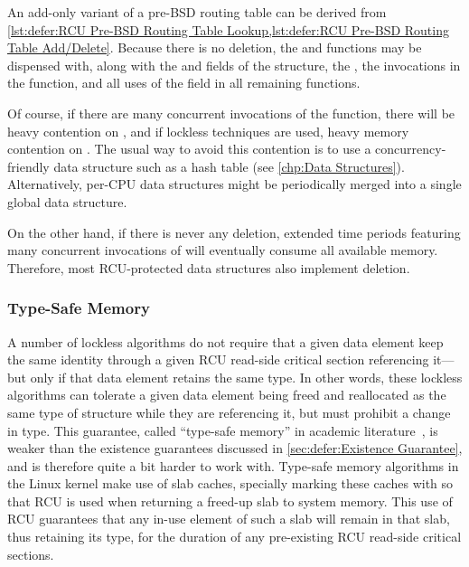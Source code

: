An add-only variant of a pre-BSD routing table can be derived from
\cref{lst:defer:RCU Pre-BSD Routing Table Lookup,lst:defer:RCU Pre-BSD Routing Table Add/Delete}.
Because there is no deletion, the  and 
functions may be dispensed with, along with the 
and  fields of the  structure, the
, the  invocations in the
 function, and all uses of the  field
in all remaining functions.

Of course, if there are many concurrent invocations of the 
function, there will be heavy contention on , and if lockless
techniques are used, heavy memory contention on .
The usual way to avoid this contention is to use a concurrency-friendly
data structure such as a hash table (see \cref{chp:Data Structures}).
Alternatively, per-CPU data structures might be periodically merged
into a single global data structure.

On the other hand, if there is never any deletion, extended time periods
featuring many concurrent invocations of  will eventually
consume all available memory.
Therefore, most RCU-protected data structures also implement deletion.

\subsubsection{Type-Safe Memory}
\label{sec:defer:Type-Safe Memory}

A number of lockless algorithms do not require that a given data
element keep the same identity through a given RCU read-side critical
section referencing it---but only if that data element retains the
same type.
In other words, these lockless algorithms can tolerate a given data
element being freed and reallocated as the same type of structure
while they are referencing it, but must prohibit a change in type.
This guarantee, called ``type-safe memory'' in
academic literature~\cite{Cheriton96a},
is weaker than the existence guarantees discussed
in \cref{sec:defer:Existence Guarantee},
and is therefore quite a bit harder to work with.
Type-safe memory algorithms in the Linux kernel make use of slab caches,
specially marking these caches with 
so that RCU is used when returning a freed-up
slab to system memory.
This use of RCU guarantees that any in-use element of
such a slab will remain in that slab, thus retaining its type,
for the duration of any pre-existing RCU read-side critical sections.

